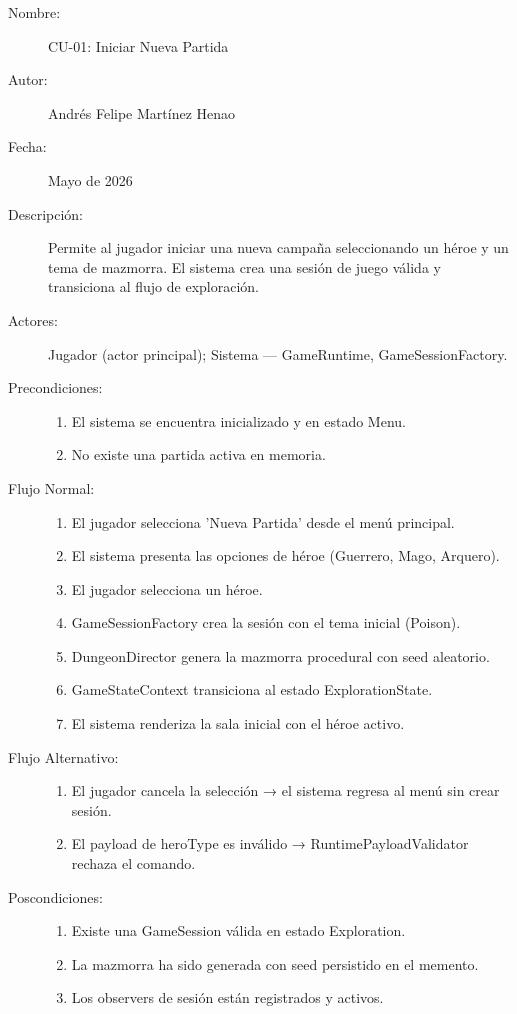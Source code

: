\documentclass[stu,12pt,floatsintext]{apa7}
\begin{document}
\begin{description}
    \item[Nombre:] CU-01: Iniciar Nueva Partida
    \item[Autor:] Andrés Felipe Martínez Henao
    \item[Fecha:] Mayo de 2026
    \item[Descripción:] Permite al jugador iniciar una nueva campaña seleccionando un héroe y un tema de mazmorra. El sistema crea una sesión de juego válida y transiciona al flujo de exploración.
    \item[Actores:] Jugador (actor principal); Sistema — GameRuntime, GameSessionFactory.
    \item[Precondiciones:] \hfill
        \begin{enumerate}[label=\arabic*.]
            \item El sistema se encuentra inicializado y en estado Menu.
            \item No existe una partida activa en memoria.
        \end{enumerate}
    \item[Flujo Normal:] \hfill
        \begin{enumerate}[label=\arabic*.]
            \item El jugador selecciona 'Nueva Partida' desde el menú principal.
            \item El sistema presenta las opciones de héroe (Guerrero, Mago, Arquero).
            \item El jugador selecciona un héroe.
            \item GameSessionFactory crea la sesión con el tema inicial (Poison).
            \item DungeonDirector genera la mazmorra procedural con seed aleatorio.
            \item GameStateContext transiciona al estado ExplorationState.
            \item El sistema renderiza la sala inicial con el héroe activo.
        \end{enumerate}
    \item[Flujo Alternativo:] \hfill
        \begin{enumerate}[label=FA-\arabic*:]
            \item El jugador cancela la selección → el sistema regresa al menú sin crear sesión.
            \item El payload de heroType es inválido → RuntimePayloadValidator rechaza el comando.
        \end{enumerate}
    \item[Poscondiciones:] \hfill
        \begin{enumerate}[label=\arabic*.]
            \item Existe una GameSession válida en estado Exploration.
            \item La mazmorra ha sido generada con seed persistido en el memento.
            \item Los observers de sesión están registrados y activos.
        \end{enumerate}
\end{description}
\end{document}
